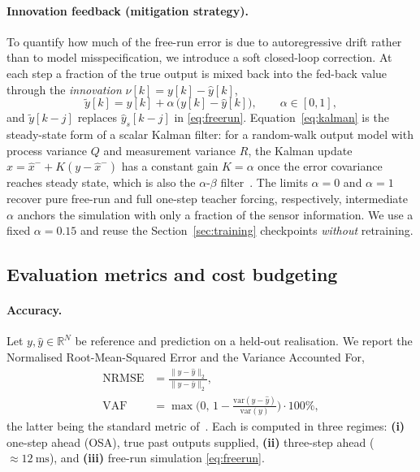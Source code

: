 \documentclass[10pt,twocolumn,letterpaper]{article}
\begin{document}
\paragraph{Innovation feedback (mitigation strategy).}
To quantify how much of the free-run error is due to autoregressive drift
rather than to model misspecification, we introduce a soft closed-loop
correction. At each step a fraction of the true output is mixed back into
the fed-back value through the \emph{innovation}
$\nu[k]=y[k]-\hat{y}[k]$,
\begin{equation}
    \tilde{y}[k] = \hat{y}[k] + \alpha\,\big(y[k]-\hat{y}[k]\big),
    \qquad \alpha\in[0,1],
    \label{eq:kalman}
\end{equation}
and $\tilde{y}[k-j]$ replaces $\hat{y}_s[k-j]$ in \eqref{eq:freerun}.
Equation~\eqref{eq:kalman} is the steady-state form of a scalar Kalman
filter: for a random-walk output model with process variance $Q$ and
measurement variance $R$, the Kalman update $\hat{x}=\hat{x}^-+
K(y-\hat{x}^-)$ has a constant gain $K=\alpha$ once the error covariance
reaches steady state, which is also the $\alpha$-$\beta$
filter~\cite{Brookner1998}. The limits $\alpha\!=\!0$ and $\alpha\!=\!1$
recover pure free-run and full one-step teacher forcing, respectively,
intermediate $\alpha$ anchors the simulation with only a fraction of the
sensor information. We use a fixed $\alpha=0.15$ and reuse the
Section~\ref{sec:training} checkpoints \emph{without} retraining.

\subsection{Evaluation metrics and cost budgeting}\label{sec:metrics}
\paragraph{Accuracy.}
Let $y,\hat{y}\in\mathbb{R}^N$ be reference and prediction on a held-out
realisation. We report the Normalised Root-Mean-Squared Error and the
Variance Accounted For,
\begin{equation}
\begin{aligned}
    \mathrm{NRMSE} &= \frac{\|y-\hat{y}\|_2}{\|y-\bar y\|_2}, \\[2pt]
    \mathrm{VAF}   &= \max\!\Big(0,\,1-\frac{\mathrm{var}(y-\hat{y})}
                      {\mathrm{var}(y)}\Big)\cdot 100\%,
\end{aligned}
    \label{eq:metrics}
\end{equation}
the latter being the standard metric of~\cite{Vlaar2018,Gu2018,Gu2021}.
Each is computed in three regimes: \textbf{(i)} one-step ahead (OSA),
true past outputs supplied, \textbf{(ii)} three-step ahead ($\approx
12~\mathrm{ms}$), and \textbf{(iii)} free-run simulation
\eqref{eq:freerun}.
\end{document}
